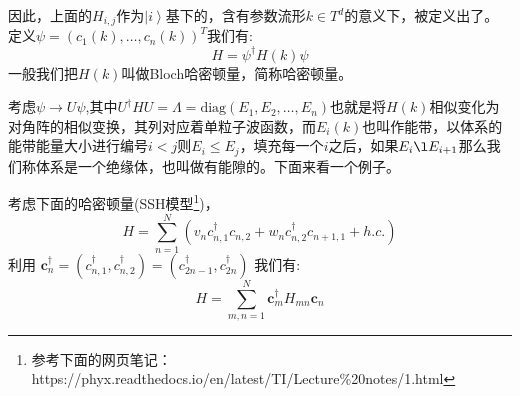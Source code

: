 \documentclass[supercite]{HustGraduPaper}
\newcommand{\ket}[1]{\left| #1 \right\rangle}
\begin{document}
因此，上面的$H_{i,j}$作为$\ket{i}$基下的，含有参数流形$k \in T^d$的意义下，被定义出了。定义$\psi = (c_1(k),\ldots,c_n(k))^T$我们有:
\begin{equation}
H = \psi^\dagger H(k) \psi
\end{equation}
一般我们把$H(k)$叫做Bloch哈密顿量，简称哈密顿量。

考虑$\psi \to U\psi$,其中$U^\dagger H U = \Lambda = \text{diag}(E_1,E_2,\ldots,E_n)$也就是将$H(k)$相似变化为对角阵的相似变换，其列对应着单粒子波函数，而$E_i(k)$也叫作能带，以体系的能带能量大小进行编号$i<j$则$E_i \le E_j$，填充每一个$i$之后，如果$E_i \l E_{i+1}$那么我们称体系是一个绝缘体，也叫做有能隙的。下面来看一个例子。

考虑下面的哈密顿量(SSH模型\cite{su1979solitons}\footnote{参考下面的网页笔记：https://phyx.readthedocs.io/en/latest/TI/Lecture\%20notes/1.html})，
\begin{equation}
H=\sum_{n=1}^N(v_n c_{n,1}^\dagger c_{n,2}+w_nc_{n,2}^\dagger c_{n+1,1}+h.c.) 
\end{equation}
利用 $\mathbf{c}_n^\dagger=(c_{n,1}^\dagger,c_{n,2}^\dagger)=(c_{2n-1}^\dagger,c_{2n}^\dagger)$ 我们有:
\begin{equation}
H=\sum_{m,n=1}^N \mathbf{c}_m^\dagger H_{mn}\mathbf{c}_n
\end{equation}
\end{document}
